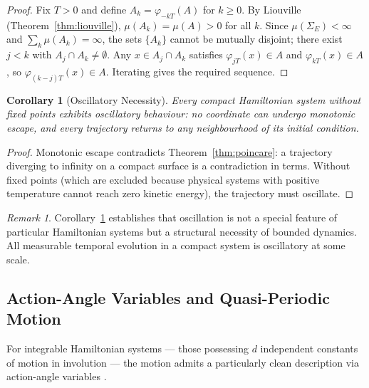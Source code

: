 \documentclass[twocolumn,10pt,a4paper]{article}
\theoremstyle{thmstyle}
\newtheorem{corollary}[theorem]{Corollary}
\theoremstyle{definition}
\theoremstyle{remark}
\newtheorem{remark}[theorem]{Remark}
\begin{document}
\begin{proof}
Fix $T > 0$ and define $A_k = \varphi_{-kT}(A)$ for $k \geq 0$. By Liouville (Theorem~\ref{thm:liouville}), $\mu(A_k) = \mu(A) > 0$ for all $k$. Since $\mu(\Sigma_E) < \infty$ and $\sum_k \mu(A_k) = \infty$, the sets $\{A_k\}$ cannot be mutually disjoint; there exist $j < k$ with $A_j \cap A_k \neq \emptyset$. Any $x \in A_j \cap A_k$ satisfies $\varphi_{jT}(x) \in A$ and $\varphi_{kT}(x) \in A$, so $\varphi_{(k-j)T}(x) \in A$. Iterating gives the required sequence.
\end{proof}

\begin{corollary}[Oscillatory Necessity]
\label{cor:osc-necessity}
Every compact Hamiltonian system without fixed points exhibits oscillatory behaviour: no coordinate can undergo monotonic escape, and every trajectory returns to any neighbourhood of its initial condition.
\end{corollary}

\begin{proof}
Monotonic escape contradicts Theorem~\ref{thm:poincare}: a trajectory diverging to infinity on a compact surface is a contradiction in terms. Without fixed points (which are excluded because physical systems with positive temperature cannot reach zero kinetic energy), the trajectory must oscillate.
\end{proof}

\begin{remark}
Corollary~\ref{cor:osc-necessity} establishes that oscillation is not a special feature of particular Hamiltonian systems but a structural necessity of bounded dynamics. All measurable temporal evolution in a compact system is oscillatory at some scale.
\end{remark}

\subsection{Action-Angle Variables and Quasi-Periodic Motion}

For integrable Hamiltonian systems --- those possessing $d$ independent constants of motion in involution --- the motion admits a particularly clean description via action-angle variables \citep{arnold1989,goldstein2002}.
\end{document}
